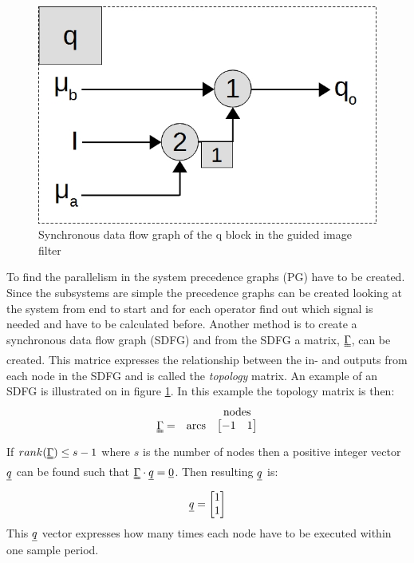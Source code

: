 \begin{figure}[ht!]
  \centering
  \includegraphics[scale=0.3]{figures/SDFG_q}
  \caption{Synchronous data flow graph of the q block in the guided image filter}
  \label{fig:sdfg_q}
\end{figure}

To find the parallelism in the system precedence graphs (PG) have to be created. Since the subsystems are simple the precedence graphs can be created looking at the system from end to start and for each operator find out which signal is needed and have to be calculated before. Another method is to create a synchronous data flow graph (SDFG) and from the SDFG a matrix, $\uuline\Gamma$, can be created. This matrice expresses the relationship between the in- and outputs from each node in the SDFG and is called the \textit{topology} matrix. An example of an SDFG is illustrated on in figure \ref{fig:sdfg_q}. In this example the topology matrix is then:
\begin{equation}
  \begin{array}{ c c c }
    & & \text{nodes} \\
  \uuline\Gamma = & \text{arcs} & 
  \begin{bmatrix}
   -1 & 1 
  \end{bmatrix}
  \end{array}
\end{equation}
If $rank(\uuline \Gamma) \leq s-1$ where $s$ is the number of nodes then a positive integer vector $\uline q$ can be found such that $\uuline\Gamma \cdot \uline q = \uline 0$. Then resulting $\uline q$ is:
\begin{equation}
  \uline{q} =
  \begin{bmatrix}
  1 \\
  1
  \end{bmatrix}
\end{equation}
This $\uline q$ vector expresses how many times each node have to be executed within one sample period.\\

